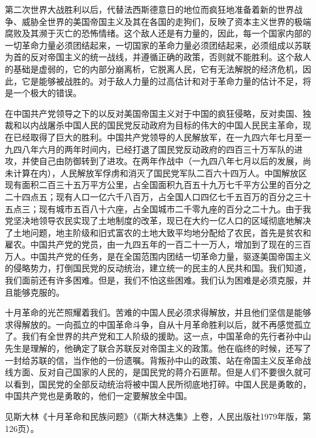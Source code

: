 第二次世界大战胜利以后，代替法西斯德意日的地位而疯狂地准备着新的世界战争、威胁全世界的美国帝国主义及其在各国的走狗们，反映了资本主义世界的极端腐败及其濒于灭亡的恐怖情绪。这个敌人还是有力量的，因此，每一个国家内部的一切革命力量必须团结起来，一切国家的革命力量必须团结起来，必须组成以苏联为首的反对帝国主义的统一战线，并遵循正确的政策，否则就不能胜利。这个敌人的基础是虚弱的，它的内部分崩离析，它脱离人民，它有无法解脱的经济危机，因此，它是能够被战胜的。对于敌人力量的过高估计和对于革命力量的估计不足，将是一个极大的错误。

在中国共产党领导之下的以反对美国帝国主义对于中国的疯狂侵略，反对卖国、独裁和以内战屠杀中国人民的国民党反动政府为目标的伟大的中国人民民主革命，现在已经取得了巨大的胜利。中国共产党领导的人民解放军，在一九四六年七月至一九四八年六月的两年时间内，已经打退了国民党反动政府的四百三十万军队的进攻，并使自己由防御转到了进攻。在两年作战中（一九四八年七月以后的发展，尚未计算在内），人民解放军俘虏和消灭了国民党军队二百六十四万人。中国解放区现有面积二百三十五万平方公里，占全国面积九百五十九万七千平方公里的百分之二十四点五；现有人口一亿六千八百万，占全国人口四亿七千五百万的百分之三十五点三；现有城市五百八十六座，占全国城市二千零九座的百分之二十九。由于我党坚决地领导农民实现了土地制度的改革，现已在大约一亿人口的区域彻底地解决了土地问题，地主阶级和旧式富农的土地大致平均地分配给了农民，首先是贫农和雇农。中国共产党的党员，由一九四五年的一百二十一万人，增加到了现在的三百万人。中国共产党的任务，是在全国范围内团结一切革命力量，驱逐美国帝国主义的侵略势力，打倒国民党的反动统治，建立统一的民主的人民共和国。我们知道，我们面前还有许多困难。但是，我们不怕这些困难。我们认为困难是必须克服，并且能够克服的。

十月革命的光芒照耀着我们。苦难的中国人民必须求得解放，并且他们坚信是能够求得解放的。一向孤立的中国革命斗争，自从十月革命胜利以后，就不再感觉孤立了。我们有全世界的共产党和工人阶级的援助。这一点，中国革命的先行者孙中山先生是理解的，他确定了联合苏联反对帝国主义的政策。他在临终的时候，还写了一封给苏联的信，当作他的一份遗嘱。背叛孙中山的政策、站在帝国主义反革命战线方面、反对自己国家的人民的，是国民党的蒋介石匪帮。但是人们不要很久就可以看到，国民党的全部反动统治将被中国人民所彻底地打碎。中国人民是勇敢的，中国共产党也是勇敢的，他们一定要解放全中国。


\begin{maonote}
见斯大林《十月革命和民族问题》（《斯大林选集》上卷，人民出版社1979年版，第126页）。
\end{maonote}
